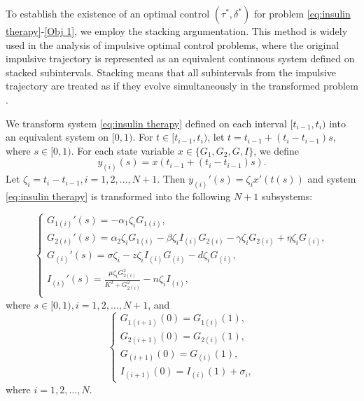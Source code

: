 \documentclass[a4paper,fleqn]{cas-sc}
\numberwithin{equation}{section}
\numberwithin{equation}{section}
\newcommand{\1}{\boldsymbol{1}}
\newcommand{\0}{\boldsymbol{0}}
\begin{document}
To establish the existence of an optimal control $(\tau^*,\delta^*)$ for problem \eqref{eq:insulin therapy}-\eqref{Obj 1}, we employ the stacking argumentation. This method is widely used in the analysis of impulsive optimal control problems, where the original impulsive trajectory is represented as an equivalent continuous system defined on stacked subintervals. Stacking means that all subintervals from the impulsive trajectory are treated as if they evolve
simultaneously in the transformed problem \cite{Bohme2017,liu1998statejumps}.

We transform system \eqref{eq:insulin therapy} defined on each interval $[t_{i-1},t_i)$ into an equivalent system on $[0,1)$. For $t \in [t_{i-1}, t_i)$, let $t = t_{i-1} + (t_i-t_{i-1})s$, where $s \in [0,1)$. For each state variable $x \in \{G_1, G_2, G, I\}$, we define 
\begin{equation*}
    y_{(i)}(s) = x(t_{i-1}+(t_i-t_{i-1})s).
\end{equation*}
Let $\zeta_i = t_i - t_{i-1}, i =1,2,...,N+1$. Then $y_{(i)}'(s) = \zeta_i x'(t(s))$ and system \eqref{eq:insulin therapy} is transformed into the following $N+1$ subsystems:

\begin{equation}\label{eq:insulin therapy transform}
\begin{cases}
G_{1(i)}'(s) = -\alpha_1\zeta_i G_{1(i)}, \\
G_{2(i)}'(s) = \alpha_2\zeta_i G_{1(i)}
         - \beta\zeta_i I_{(i)}G_{2(i)}
         - \gamma\zeta_i G_{2(i)}
         + \eta\zeta_i G_{(i)},\\
G_{(i)}'(s) = \sigma\zeta_i
         - z\zeta_i I_{(i)} G_{(i)}
         - d\zeta_i G_{(i)}, \\
I_{(i)}'(s) = \frac{\mu\zeta_i G_{2(i)}^2}
         {K^2 + G_{2(i)}^2}
         - n\zeta_i I_{(i)},\\
\end{cases}
\end{equation}
where $s \in [0,1), i = 1,2,\ldots,N+1$, and 
\begin{equation}\label{eq:insulin therapy transform boundary}
\begin{cases}
G_{1(i+1)}(0) = G_{1(i)}(1), \\
G_{2(i+1)}(0) = G_{2(i)}(1), \\
G_{(i+1)}(0) = G_{(i)}(1), \\
I_{(i+1)}(0) = I_{(i)}(1) + \sigma_i,
\end{cases}
\end{equation}
where $i = 1,2,\ldots,N$. 
\end{document}
